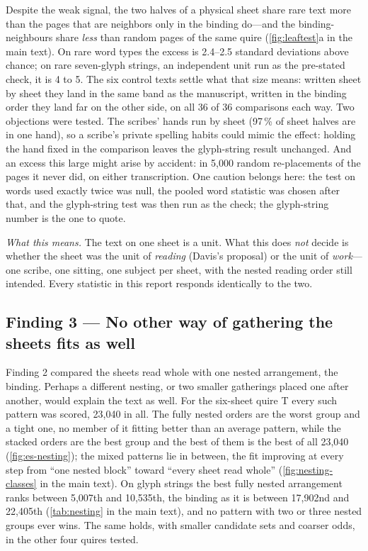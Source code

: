 \documentclass[11pt,a4paper]{article}
\begin{document}
Despite the weak signal, the two halves of a physical sheet share rare text more than the pages that are neighbors only in the binding do---and the binding-neighbours share \emph{less} than random pages of the same quire (\cref{fig:leaftest}a in the main text). On rare word types the excess is 2.4--2.5 standard deviations above chance; on rare seven-glyph strings, an independent unit run as the pre-stated check, it is 4 to 5. The six control texts settle what that size means: written sheet by sheet they land in the same band as the manuscript, written in the binding order they land far on the other side, on all 36 of 36 comparisons each way. Two objections were tested. The scribes' hands run by sheet (97\,\% of sheet halves are in one hand), so a scribe's private spelling habits could mimic the effect: holding the hand fixed in the comparison leaves the glyph-string result unchanged. And an excess this large might arise by accident: in 5,000 random re-placements of the pages it never did, on either transcription. One caution belongs here: the test on words used exactly twice was null, the pooled word statistic was chosen after that, and the glyph-string test was then run as the check; the glyph-string number is the one to quote.

\emph{What this means.} The text on one sheet is a unit. What this does \emph{not} decide is whether the sheet was the unit of \emph{reading} (Davis's proposal) or the unit of \emph{work}---one scribe, one sitting, one subject per sheet, with the nested reading order still intended. Every statistic in this report responds identically to the two.

\subsection*{Finding 3 --- No other way of gathering the sheets fits as well}

Finding 2 compared the sheets read whole with one nested arrangement, the binding. Perhaps a different nesting, or two smaller gatherings placed one after another, would explain the text as well. For the six-sheet quire T every such pattern was scored, 23,040 in all. The fully nested orders are the worst group and a tight one, no member of it fitting better than an average pattern, while the stacked orders are the best group and the best of them is the best of all 23,040 (\cref{fig:es-nesting}); the mixed patterns lie in between, the fit improving at every step from ``one nested block'' toward ``every sheet read whole'' (\cref{fig:nesting-classes} in the main text). On glyph strings the best fully nested arrangement ranks between 5,007th and 10,535th, the binding as it is between 17,902nd and 22,405th (\cref{tab:nesting} in the main text), and no pattern with two or three nested groups ever wins. The same holds, with smaller candidate sets and coarser odds, in the other four quires tested.
\end{document}
